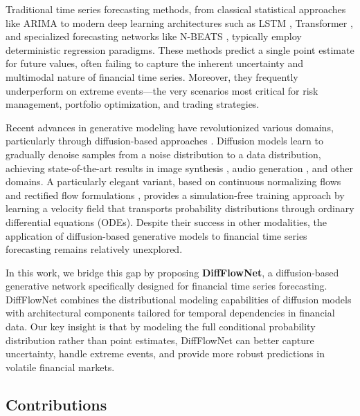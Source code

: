 \documentclass[11pt,a4paper]{article}
\begin{document}
Traditional time series forecasting methods, from classical statistical approaches like ARIMA \cite{box2015time} to modern deep learning architectures such as LSTM \cite{hochreiter1997lstm}, Transformer \cite{vaswani2017attention}, and specialized forecasting networks like N-BEATS \cite{oreshkin2019nbeats}, typically employ deterministic regression paradigms. These methods predict a single point estimate for future values, often failing to capture the inherent uncertainty and multimodal nature of financial time series. Moreover, they frequently underperform on extreme events—the very scenarios most critical for risk management, portfolio optimization, and trading strategies.

Recent advances in generative modeling have revolutionized various domains, particularly through diffusion-based approaches \cite{ho2020denoising,song2021scorebased}. Diffusion models learn to gradually denoise samples from a noise distribution to a data distribution, achieving state-of-the-art results in image synthesis \cite{dhariwal2021diffusion,rombach2022latent}, audio generation \cite{kong2021diffwave}, and other domains. A particularly elegant variant, based on continuous normalizing flows and rectified flow formulations \cite{lipman2022flow,liu2023rectified}, provides a simulation-free training approach by learning a velocity field that transports probability distributions through ordinary differential equations (ODEs). Despite their success in other modalities, the application of diffusion-based generative models to financial time series forecasting remains relatively unexplored.

In this work, we bridge this gap by proposing \textbf{DiffFlowNet}, a diffusion-based generative network specifically designed for financial time series forecasting. DiffFlowNet combines the distributional modeling capabilities of diffusion models with architectural components tailored for temporal dependencies in financial data. Our key insight is that by modeling the full conditional probability distribution rather than point estimates, DiffFlowNet can better capture uncertainty, handle extreme events, and provide more robust predictions in volatile financial markets.

\subsection{Contributions}
\end{document}
